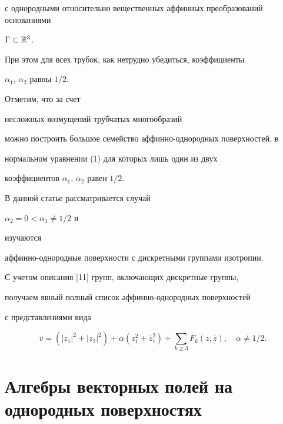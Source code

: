 с однородными относительно вещественных аффинных преобразований основаниями 


$ \Gamma \subset \Bbb R^3 $.


При этом для всех трубок, как нетрудно убедиться, коэффициенты 


$ \alpha_1$, $\alpha_2 $ равны $ 1/2 $. 











Отметим, что за счет 


несложных возмущений трубчатых многообразий 


можно построить большое семейство аффинно-однородных поверхностей, в 


нормальном уравнении (1) для которых лишь один из двух 


коэффициентов $ \alpha_1$, $\alpha_2 $ равен $ 1/2 $.





В данной статье рассматривается случай 


$ \alpha_2 = 0 < \alpha_1 \ne 1/2 $ и 


изучаются


аффинно-однородные поверхности с дискретными группами изотропии.


С учетом описания [11] групп, включающих дискретные группы,


получаем явный полный список аффинно-однородных поверхностей


с представлениями вида


\begin{equation}


 v = ( | z_1 |^2 + |z_2 |^2 ) + \alpha ( z_1^2 + \overline z_1^2 )


 + \sum_{k \ge 3} F_k(z,\overline z), \quad \alpha \ne 1/2. 


\end{equation}








\section{Алгебры векторных полей на однородных поверхностях}








